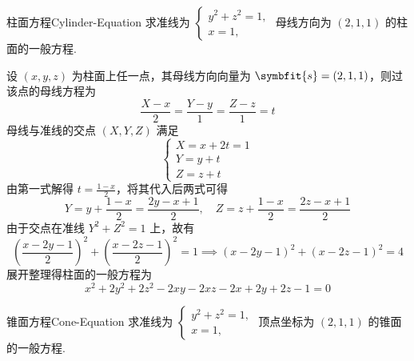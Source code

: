 \begin{problem}{柱面方程}{Cylinder-Equation}
    求准线为 $\begin{cases} y^2 + z^2 = 1, \\ x = 1, \end{cases}$ 母线方向为 $(2, 1, 1)$ 的柱面的一般方程.
\end{problem}

\begin{solution}
    设 $(x, y, z)$ 为柱面上任一点，其母线方向向量为 $\symbfit{s} = (2, 1, 1)$，则过该点的母线方程为
    \begin{equation*}
        \frac{X - x}{2} = \frac{Y - y}{1} = \frac{Z - z}{1} = t
    \end{equation*}
    母线与准线的交点 $(X, Y, Z)$ 满足
    \begin{equation*}
        \begin{cases}
            X = x + 2t = 1 \\
            Y = y + t      \\
            Z = z + t
        \end{cases}
    \end{equation*}
    由第一式解得 $t = \frac{1 - x}{2}$，将其代入后两式可得
    \begin{equation*}
        Y = y + \frac{1 - x}{2} = \frac{2y - x + 1}{2}, \quad Z = z + \frac{1 - x}{2} = \frac{2z - x + 1}{2}
    \end{equation*}
    由于交点在准线 $Y^2 + Z^2 = 1$ 上，故有
    \begin{equation*}
        \left(\frac{x - 2y - 1}{2}\right)^2 + \left(\frac{x - 2z - 1}{2}\right)^2 = 1 \implies (x - 2y - 1)^2 + (x - 2z - 1)^2 = 4
    \end{equation*}
    展开整理得柱面的一般方程为
    \begin{equation*}
        \boxed{x^2 + 2y^2 + 2z^2 - 2xy - 2xz - 2x + 2y + 2z - 1 = 0}
    \end{equation*}
\end{solution}


\begin{problem}{锥面方程}{Cone-Equation}
    求准线为 $\begin{cases} y^2 + z^2 = 1, \\ x = 1, \end{cases}$ 顶点坐标为 $(2, 1, 1)$ 的锥面的一般方程.
\end{problem}

